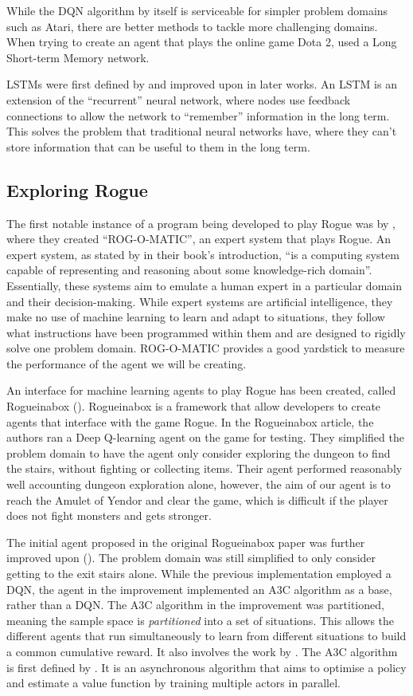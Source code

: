 \documentclass[11pt,a4paper]{article}
\begin{document}
    While the DQN algorithm by itself is serviceable for simpler problem domains such as Atari, there are better methods to tackle more challenging domains. When trying to create an agent that plays the online game Dota 2, \cite{berner19} used a Long Short-term Memory network.

    LSTMs were first defined by \cite{hochreiter97} and improved upon in later works. An LSTM is an extension of the ``recurrent'' neural network, where nodes use feedback connections to allow the network to ``remember'' information in the long term. This solves the problem that traditional neural networks have, where they can't store information that can be useful to them in the long term.

    \subsection{Exploring Rogue}
    The first notable instance of a program being developed to play Rogue was by \cite{mauldin83}, where they created ``ROG-O-MATIC'', an expert system that plays Rogue. An expert system, as stated by \cite{jackson86} in their book's introduction, ``is a computing system capable of representing and reasoning about some knowledge-rich domain''. Essentially, these systems aim to emulate a human expert in a particular domain and their decision-making. While expert systems are artificial intelligence, they make no use of machine learning to learn and adapt to situations, they follow what instructions have been programmed within them and are designed to rigidly solve one problem domain. ROG-O-MATIC provides a good yardstick to measure the performance of the agent we will be creating.

    An interface for machine learning agents to play Rogue has been created, called Rogueinabox (\cite{asperti17}). Rogueinabox is a framework that allow developers to create agents that interface with the game Rogue. In the Rogueinabox article, the authors ran a Deep Q-learning agent on the game for testing. They simplified the problem domain to have the agent only consider exploring the dungeon to find the stairs, without fighting or collecting items. Their agent performed reasonably well accounting dungeon exploration alone, however, the aim of our agent is to reach the Amulet of Yendor and clear the game, which is difficult if the player does not fight monsters and gets stronger.

    The initial agent proposed in the original Rogueinabox paper was further improved upon (\cite{asperti18}). The problem domain was still simplified to only consider getting to the exit stairs alone. While the previous implementation employed a DQN, the agent in the improvement implemented an A3C algorithm as a base, rather than a DQN. The A3C algorithm in the improvement was partitioned, meaning the sample space is \emph{partitioned} into a set of situations. This allows the different agents that run simultaneously to learn from different situations to build a common cumulative reward. It also involves the work by \cite{jaderberg16}. The A3C algorithm is first defined by \cite{mnih15}. It is an asynchronous algorithm that aims to optimise a policy and estimate a value function by training multiple actors in parallel.
\end{document}
